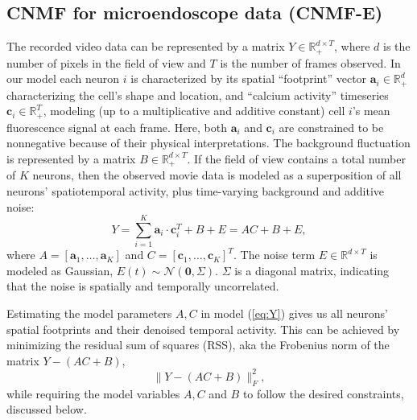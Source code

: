 \documentclass[9pt,lineno]{elife}
\begin{document}
\subsection{CNMF for microendoscope data (CNMF-E)}
The recorded video data can be represented by a matrix $Y\in \mathbb{R}_+^{d\times T}$, where $d$ is the number of pixels in the field of view and $T$ is the number of frames observed. In our model each neuron $i$ is characterized by its spatial ``footprint'' vector $\bm{a}_i\in \mathbb{R}_+^d$ characterizing the cell's shape and location, and ``calcium activity'' timeseries $\bm{c}_i\in \mathbb{R}_+^T$, modeling (up to a multiplicative and additive constant) cell $i$'s mean fluorescence signal at each frame.  Here, both $\bm{a}_i$ and $\bm{c}_i$ are constrained to be nonnegative because of their physical interpretations. The background fluctuation is represented by a matrix ${B}\in \mathbb{R}_+^{d\times T}$. If the field of view contains a total number of $K$ neurons, then the observed movie data is modeled as a superposition of all neurons' spatiotemporal activity, plus time-varying background and additive noise:  
\begin{equation}
  Y = \sum_{i=1}^K\bm{a}_i\cdot\bm{c}_i^T +B+E=AC +B+E, \label{eq:Y}
\end{equation}
where  $A=[\bm{a}_1, \ldots, \bm{a}_K]$ and  $C=[\bm{c}_1, \ldots, \bm{c}_K]^T$. The noise term $E\in\mathbb{R}^{d\times T}$ is modeled as Gaussian,  $E(t)\sim \mathcal{N}(\bm{0}, \Sigma)$. $\Sigma$ is a diagonal matrix, indicating that the noise is spatially and temporally uncorrelated.

Estimating the model parameters $A, C$ in model (\ref{eq:Y}) gives us all neurons' spatial footprints and their denoised temporal activity. This can be achieved by minimizing the residual sum of squares (RSS), aka the Frobenius norm of the matrix $Y-(AC+B)$, 
\begin{equation}
  \|Y-(AC+B)\|_F^2,
\end{equation} 
while requiring the model variables $A, C$ and $B$ to follow the desired constraints, discussed below.
\end{document}
